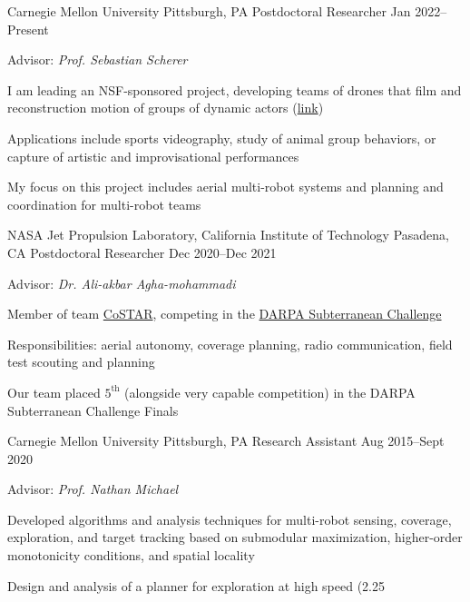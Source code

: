 
\begin{cventries}
  \cventry
  {Carnegie Mellon University}
  {Pittsburgh, PA}
  {Postdoctoral Researcher}
  {Jan 2022--Present}
  {
    Advisor: \emph{Prof. Sebastian Scherer}\linebreak
    \begin{cvitems}
    \item I am leading an NSF-sponsored project, developing teams of drones that
      film and reconstruction motion of groups of dynamic actors
      (\href{https://theairlab.org/multidrone/}{link})
    \item Applications include sports videography, study of animal
      group behaviors, or capture of artistic and improvisational performances
    \item My focus on this project includes aerial multi-robot systems and
      planning and coordination for multi-robot teams
    \end{cvitems}
  }
  \cventry
  {NASA Jet Propulsion Laboratory, California Institute of Technology}
  {Pasadena, CA}
  {Postdoctoral Researcher}
  {Dec 2020--Dec 2021}
  {
    Advisor: \emph{Dr. Ali-akbar Agha-mohammadi}\linebreak
    \begin{cvitems}
    \item Member of team \href{https://costar.jpl.nasa.gov/}{CoSTAR}, competing in the
      \href{https://www.subtchallenge.com/}{DARPA Subterranean Challenge}
    \item Responsibilities:
      aerial autonomy, coverage planning, radio communication,
      field test scouting and planning
    \item Our team placed $5^\mathrm{th}$ (alongside very capable competition)
      in the DARPA Subterranean Challenge Finals
    \end{cvitems}
  }
  \cventrytwo
  {Carnegie Mellon University}
  {Pittsburgh, PA}
  {Research Assistant}
  {Aug 2015--Sept 2020}
  {
    Advisor: \emph{Prof. Nathan Michael}\linebreak
    \begin{cvitems} %
    \item Developed algorithms and analysis techniques for multi-robot sensing,
      coverage, exploration, and target tracking based on submodular
      maximization, higher-order monotonicity conditions, and spatial locality
    \item Design and analysis of a planner for exploration at high speed (2.25

\end{cvitems}}
\end{cventries}
